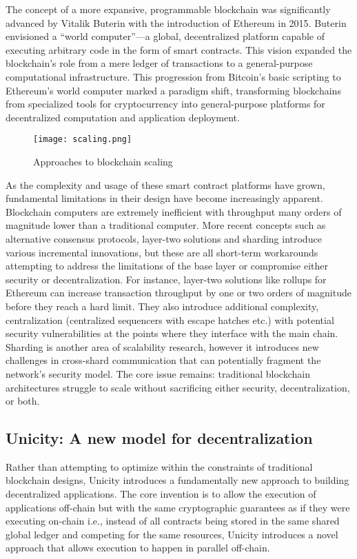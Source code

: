 \documentclass{article}
\begin{document}
The concept of a more expansive, programmable blockchain was significantly advanced by Vitalik Buterin with the introduction of Ethereum in 2015. Buterin envisioned a ``world computer''---a global, decentralized platform capable of executing arbitrary code in the form of smart contracts. This vision expanded the blockchain's role from a mere ledger of transactions to a general-purpose computational infrastructure. This progression from Bitcoin's basic scripting to Ethereum's world computer marked a paradigm shift, transforming blockchains from specialized tools for cryptocurrency into general-purpose platforms for decentralized computation and application deployment.

\begin{figure}[H]
    \centering
    \texttt{[image: scaling.png]}
    \caption{Approaches to blockchain scaling}
    \label{fig:scaling}
\end{figure}


As the complexity and usage of these smart contract platforms have grown, fundamental limitations in their design have become increasingly apparent. Blockchain computers are extremely inefficient with throughput many orders of magnitude lower than a traditional computer. More recent concepts such as alternative consensus protocols, layer-two solutions and sharding introduce various incremental innovations, but these are all short-term workarounds attempting to address the limitations of the base layer or compromise either security or decentralization. For instance, layer-two solutions like rollups for Ethereum can increase transaction throughput by one or two orders of magnitude before they reach a hard limit. They also introduce additional complexity, centralization (centralized sequencers with escape hatches etc.) with potential security vulnerabilities at the points where they interface with the main chain. Sharding is another area of scalability research, however it introduces new challenges in cross-shard communication that can potentially fragment the network's security model. The core issue remains: traditional blockchain architectures struggle to scale without sacrificing either security, decentralization, or both.

\subsection{Unicity: A new model for decentralization}

Rather than attempting to optimize within the constraints of traditional blockchain designs, Unicity introduces a fundamentally new approach to building decentralized applications. The core invention is to allow the execution of applications off-chain but with the same cryptographic guarantees as if they were executing on-chain i.e., instead of all contracts being stored in the same shared global ledger and competing for the same resources, Unicity introduces a novel approach that allows execution to happen in parallel off-chain.
\end{document}
